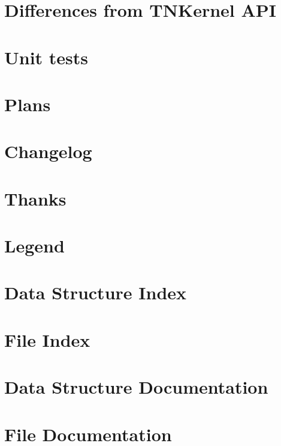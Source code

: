 \documentclass[twoside]{book}
\newcommand{\+}{\discretionary{\mbox{\scriptsize$\hookleftarrow$}}{}{}}
\begin{document}
\chapter{Differences from T\+N\+Kernel A\+P\+I}
\label{tnkernel_diff}
\hypertarget{tnkernel_diff}{}

\chapter{Unit tests}
\label{unit_tests}
\hypertarget{unit_tests}{}

\chapter{Plans}
\label{plans}
\hypertarget{plans}{}

\chapter{Changelog}
\label{changelog}
\hypertarget{changelog}{}

\chapter{Thanks}
\label{thanks}
\hypertarget{thanks}{}

\chapter{Legend}
\label{legend}
\hypertarget{legend}{}

\chapter{Data Structure Index}

\chapter{File Index}

\chapter{Data Structure Documentation}











\chapter{File Documentation}
















\newpage
{}
{}
\printindex
\end{document}
